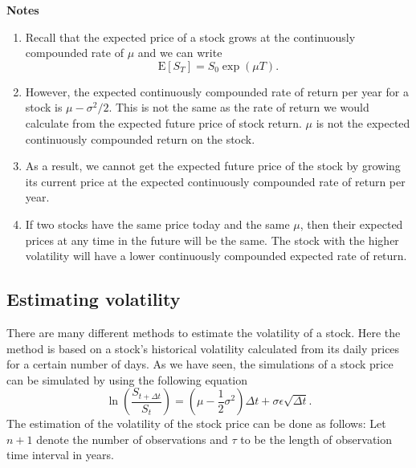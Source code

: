 \documentclass[
]{book}
\theoremstyle{definition}
\theoremstyle{definition}
\theoremstyle{definition}
\theoremstyle{definition}
\theoremstyle{remark}
\begin{document}
\textbf{Notes}

\begin{enumerate}
\def\labelenumi{\arabic{enumi}.}
\item
  Recall that the expected price of a stock grows at the continuously
  compounded rate of \(\mu\) and we can write
  \[\mathrm{E}[S_T] = S_0 \exp(\mu T).\]
\item
  However, the expected continuously compounded rate of return per
  year for a stock is \(\mu - \sigma^2/2\). This is not the same as the
  rate of return we would calculate from the expected future price of
  stock return. \(\mu\) is not the expected continuously compounded
  return on the stock.
\item
  As a result, we cannot get the expected future price of the stock by
  growing its current price at the expected continuously compounded
  rate of return per year.
\item
  If two stocks have the same price today and the same \(\mu\), then
  their expected prices at any time in the future will be the same.
  The stock with the higher volatility will have a lower continuously
  compounded expected rate of return.
\end{enumerate}

\hypertarget{estimating-volatility}{%
\subsection{Estimating volatility}\label{estimating-volatility}}

There are many different methods to estimate the volatility of a stock.
Here the method is based on a stock's historical volatility calculated
from its daily prices for a certain number of days. As we have seen, the
simulations of a stock price can be simulated by using the following
equation
\[\ln\left(  \frac{S_{t+\Delta t}}{S_t} \right) = (\mu - \frac{1}{2}\sigma^2 )\Delta t + \sigma \epsilon \sqrt{\Delta t}.\]
The estimation of the volatility of the stock price can be done as
follows: Let \(n+1\) denote the number of observations and \(\tau\) to be
the length of observation time interval in years.
\end{document}
